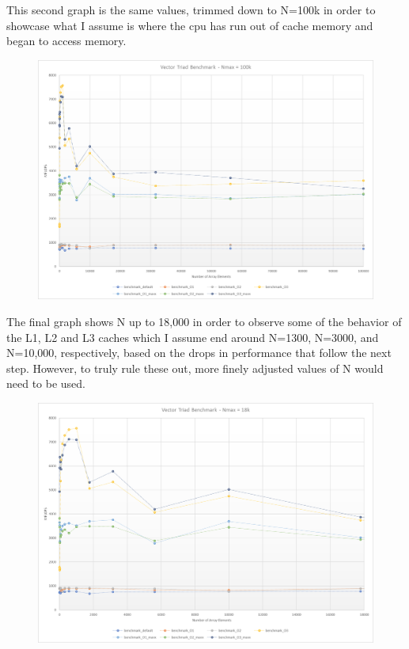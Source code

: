 \documentclass[a4paper, 11pt]{article}
\begin{document}
\newpage
This second graph is the same values, trimmed down to N=100k in order to showcase what I assume is where the cpu has run out of cache memory and began to access memory.
\begin{figure}[H]
	\centering
	\includegraphics[width=6in]{benchmark_100k.png}
\end{figure}

\newpage

The final graph shows N up to 18,000 in order to observe some of the behavior of the L1, L2 and L3 caches which I assume end around N=1300, N=3000, and N=10,000, respectively, based on the drops in performance that follow the next step. However, to truly rule these out, more finely adjusted values of N would need to be used.
\begin{figure}[H]
	\centering
	\includegraphics[width=6in]{benchmark_10k.png}
\end{figure}
\end{document}
